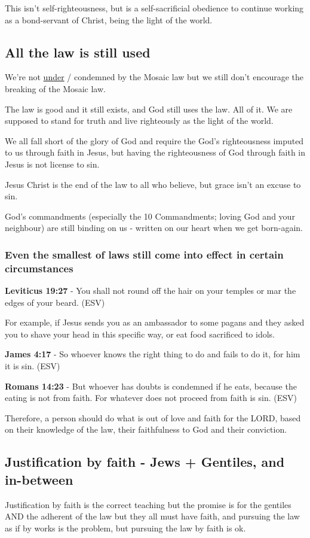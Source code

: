 \documentclass[11pt]{article}
\begin{document}
This isn't self-righteousness, but is a self-sacrificial obedience to continue working as a bond-servant of Christ, being the light of the world.

\subsection{All the law is still used}
\label{sec:org03af20a}
We're not \uline{under} / condemned by the Mosaic law but we still don't encourage the breaking of the Mosaic law.

The law is good and it still exists, and God still uses the law. All of it. We are supposed to stand for truth and live righteously as the light of the world.

We all fall short of the glory of God and require the God's righteousness imputed to us through faith in Jesus, but having the righteousness of God through faith in Jesus is not license to sin.

Jesus Christ is the end of the law to all who believe, but grace isn't an excuse to sin.

God's commandments (especially the 10 Commandments; loving God and your neighbour) are still binding on us - written on our heart when we get born-again.

\subsubsection{Even the smallest of laws still come into effect in certain circumstances}
\label{sec:org4f312d6}

\textbf{Leviticus 19:27} - You shall not round off the hair on your temples or mar the edges of your beard. (ESV)

For example, if Jesus sends you as an ambassador to some pagans and they asked you to shave your head in this specific way, or eat food sacrificed to idols.

\textbf{James 4:17} - So whoever knows the right thing to do and fails to do it, for him it is sin. (ESV)

\textbf{Romans 14:23} - But whoever has doubts is condemned if he eats, because the eating is not from faith. For whatever does not proceed from faith is sin. (ESV)

Therefore, a person should do what is out of love and faith for the LORD, based on their knowledge of the law,
their faithfulness to God and their conviction.

\subsection{Justification by faith - Jews + Gentiles, and in-between}
\label{sec:org6399b28}
Justification by faith is the correct teaching but the promise is for the gentiles AND the adherent of the law but they all must have faith, and pursuing the law as if by works is the problem, but pursuing the law by faith is ok.
\end{document}

